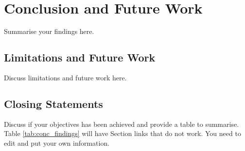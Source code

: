 \chapter{Conclusion and Future Work}\label{chap:conclusion}
Summarise your findings here.

\section{Limitations and Future Work}\label{sec:limit}
Discuss limitations and future work here.

\section{Closing Statements}\label{sec:closing}
Discuss if your objectives has been achieved and provide a table to summarise. Table \ref{tab:conc_findings} will have Section links that do not work. You need to edit and put your own information.

